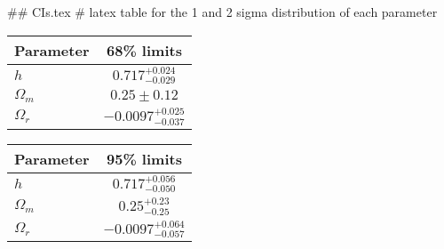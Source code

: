 ## CIs.tex
# latex table for the 1 and 2 sigma distribution of each parameter

\begin{tabular} { l  c}
 Parameter &  68\% limits\\
\hline
{\boldmath$h              $} & $0.717^{+0.024}_{-0.029}   $\\
{\boldmath$\Omega_m       $} & $0.25\pm 0.12              $\\
{\boldmath$\Omega_r       $} & $-0.0097^{+0.025}_{-0.037} $\\
\hline
\end{tabular}

\begin{tabular} { l  c}
 Parameter &  95\% limits\\
\hline
{\boldmath$h              $} & $0.717^{+0.056}_{-0.050}   $\\
{\boldmath$\Omega_m       $} & $0.25^{+0.23}_{-0.25}      $\\
{\boldmath$\Omega_r       $} & $-0.0097^{+0.064}_{-0.057} $\\
\hline
\end{tabular}
